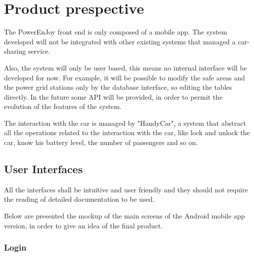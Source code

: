 \section{Product prespective}

The PowerEnJoy front end is only composed of a mobile app.
The system developed will not be integrated with other existing systems that managed a car-sharing service.

Also, the system will only be user based, this means no internal interface will be developed for now.
For example, it will be possible to modify the safe areas and the power grid stations only by the database interface, so editing the tables directly.
In the future some API will be provided, in order to permit the evolution of the features of the system.

The interaction with the car is managed by "HandyCar", a system that abstract all the operations related to the interaction with the car, like lock and unlock the car, know his battery level, the number of passengers and so on.


\subsection{User Interfaces}
All the interfaces shall be intuitive and user friendly and they should not
require the reading of detailed documentation to be used.

Below are presented the mockup of the main screens of the Android mobile app version, in order to give an idea of the final product.

\subsubsection*{Login}

